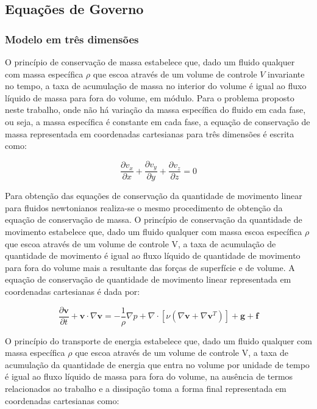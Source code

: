 \documentclass[a4paper,portuges,12pt]{article}
\newcommand{\vvet}{\mathbf{v}}
\begin{document}
\subsection{Equações de Governo}

\subsubsection{Modelo em três dimensões}
\label{sec:3-dimension}

O princípio de conservação de massa estabelece que, dado um fluido
qualquer com massa específica $\rho$ que escoa através de um volume de
controle $V$ invariante no tempo, a taxa de acumulação de massa no
interior do volume é igual ao fluxo líquido de massa para fora do
volume, em módulo. Para o problema proposto neste trabalho, onde não há
variação da massa específica do fluido em cada fase, ou seja, a massa
específica é constante em cada fase, a equação de conservação de massa
representada em coordenadas cartesianas para três dimensões é escrita como:

\begin{equation}
	\frac{\partial v_x}{\partial x} +
	\frac{\partial v_y}{\partial y} +
	\frac{\partial v_z}{\partial z}  
	= 
	0
	\label{eq:cm9}
\end{equation}\vspace{0.5cm}

Para obtenção das equações de conservação da quantidade de movimento
linear para fluidos newtonianos realiza-se o mesmo procedimento de
obtenção da equação de conservação de massa. O princípio de conservação
da quantidade de movimento estabelece que, dado um fluido qualquer com
massa escoa específica $\rho$ que escoa através de um volume de controle
V, a taxa de acumulação de quantidade de movimento é igual ao fluxo
líquido de quantidade de movimento para fora do volume mais a resultante
das forças de superfície e de volume. A equação de conservação de
quantidade de movimento linear representada em coordenadas cartesianas é
dada por:

\begin{equation}
	\frac{\partial \vvet}{\partial t} + \vvet \cdot \nabla \vvet
	= 
	- \frac{1}{\rho} \nabla p +
	\nabla \cdot [\nu(\nabla \vvet + \nabla \vvet^T)] + 
	\textbf{g} + 
	\textbf{f}
\label{eq:NS3a}
\end{equation}\vspace{0.5cm}

O princípio do transporte de energia estabelece que, dado um
fluido qualquer com massa específica $\rho$ que escoa através de um
volume de controle V, a taxa de acumulação da quantidade de energia
que entra no volume por unidade de tempo é igual ao fluxo
líquido de massa para fora do volume, na ausência de termos relacionados
ao trabalho e a dissipação toma a forma final representada em
coordenadas cartesianas como:
\end{document}
